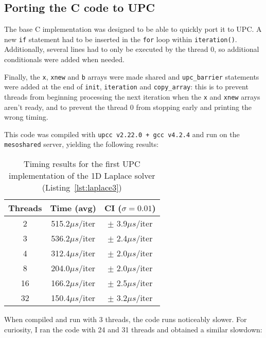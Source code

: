 \documentclass[12pt]{article}
\newcommand{\us}[0]{${\mu}s$}
\begin{document}


\subsection{Porting the C code to UPC}

The base C implementation was designed to be able to quickly port it to UPC.
A new \texttt{if} statement had to be inserted in the \texttt{for} loop within \texttt{iteration()}.
Additionally, several lines had to only be executed by the thread 0, so additional conditionals were added when needed.

Finally, the \texttt{x}, \texttt{xnew} and \texttt{b} arrays were made shared and \texttt{upc\_barrier} statements were added at the end of \texttt{init}, \texttt{iteration} and \texttt{copy\_array}:
this is to prevent threads from beginning processing the next iteration when the \texttt{x} and \texttt{xnew} arrays aren't ready, and to prevent the thread 0 from stopping early and printing the wrong timing.

This code was compiled with \texttt{upcc v2.22.0 + gcc v4.2.4} and run on the \texttt{mesoshared} server, yielding the following results:

\begin{table}[h]
  \centering\begin{tabular}{|c|c|c|}
    \hline
    Threads & Time (avg) & CI ($\sigma=0.01$) \\
    \hline
    2 & 515.2\us/iter & $\pm$ 3.9\us/iter \\
    3 & 536.2\us/iter & $\pm$ 2.4\us/iter \\
    4 & 312.4\us/iter & $\pm$ 2.0\us/iter \\
    8 & 204.0\us/iter & $\pm$ 2.0\us/iter \\
    16 & 166.2\us/iter & $\pm$ 2.5\us/iter \\
    32 & 150.4\us/iter & $\pm$ 3.2\us/iter \\
    \hline
  \end{tabular}
  \caption{Timing results for the first UPC implementation of the 1D Laplace solver (Listing~\ref{lst:laplace3})}
  \label{tab:laplace3}
\end{table}

When compiled and run with 3 threads, the code runs noticeably slower. For curiosity, I ran the code with 24 and 31 threads and obtained a similar slowdown:
\end{document}
